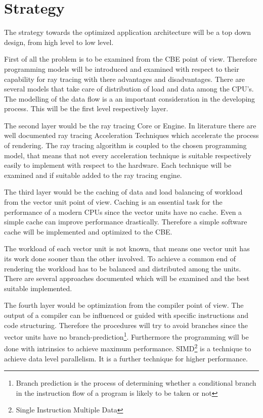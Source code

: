 \documentclass[DIV10, abstracton, openright, footsepline, headsepline, twoside, 9pt,
bigheadings]{scrreprt}
\begin{document}
\section{Strategy}
The strategy towards the optimized application architecture will be a top down
design, from high level to low level.

First of all the problem is to be examined from the CBE point of view.
Therefore programming models will be introduced and examined with respect to
their capability for ray tracing with there advantages and disadvantages. There
are several models that take care of distribution of load and data among
the CPU's. The modelling of the data flow is a an important consideration in
the developing process. This will be the first level respectively layer.

The second layer would be the ray tracing Core or Engine. In literature there
are well documented ray tracing Acceleration Techniques which accelerate the
process of rendering. The ray tracing algorithm is coupled to the chosen
programming model, that means that not every acceleration technique is
suitable respectively easily to implement with respect to the hardware. Each
technique will be examined and if suitable added to the ray tracing engine.

The third layer would be the caching of data and load balancing of workload from
the vector unit point of view. Caching is an essential task for the performance
of a modern CPUs since the vector units have no cache. Even a simple cache can
improve performance drastically. Therefore a simple software cache will be
implemented and optimized to the CBE.

The workload of each vector unit is not known, that means one vector unit has
its work done sooner than the other involved. To achieve a common end of
rendering the workload has to be balanced and distributed among the units.
There are several approaches documented which will be examined and the best
suitable implemented.

The fourth layer would be optimization from the compiler point of view.
The output of a compiler can be influenced or guided with specific instructions
and code structuring.
Therefore the procedures will try to avoid branches since the vector units
have no branch-prediction\footnote{Branch prediction is the process of
determining whether a conditional branch in the instruction flow of a program
is likely to be taken or not}. Furthermore the programming will be done with
intrinsics to achieve maximum performance. SIMD\footnote{Single Instruction
Multiple Data} is a technique to achieve data level parallelism. It is a further
technique for higher performance.
\end{document}
